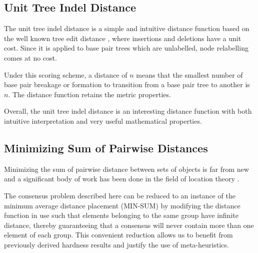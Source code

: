 \documentclass[10pt,letterpaper]{article}
\begin{document}
\subsection*{Unit Tree Indel Distance}

The unit tree indel distance is a simple and intuitive distance function based on the well known tree edit distance \cite{tai, zhang_shasha}, where insertions and deletions have a unit cost.
Since it is applied to base pair trees which are unlabelled, node relabelling comes at no cost.

\noindent Under this scoring scheme, a distance of $n$ means that the smallest number of base pair breakage or formation to transition from a base pair tree to another is $n$. The distance function retains the metric properties.

\noindent Overall, the unit tree indel distance is an interesting distance function with both intuitive interpretation and very useful mathematical properties.



\subsection*{Minimizing Sum of Pairwise Distances}





Minimizing the sum of pairwise distance between sets of objects is far from new and a significant body of work has been done in the field of location theory \cite{compact_location}. \newline


\noindent The consensus problem described here can be reduced to an instance of the minimum average distance placement (MIN-SUM) by modifying the distance function in use such that elements belonging to the same group have infinite distance, thereby guaranteeing that a consensus will never contain more than one element of each group. This convenient reduction allows us to benefit from previously derived hardness results and justify the use of meta-heuristics.
\end{document}
